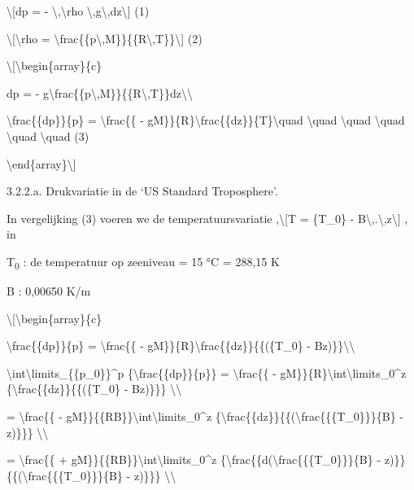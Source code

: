 \documentclass[]{article}
\begin{document}
\textbackslash{}{[}dp = - \textbackslash{},\textbackslash{}rho
\textbackslash{},g\textbackslash{},dz\textbackslash{}{]} (1)

\textbackslash{}{[}\textbackslash{}rho =
\textbackslash{}frac\{\{p\textbackslash{},M\}\}\{\{R\textbackslash{},T\}\}\textbackslash{}{]}
(2)

\textbackslash{}{[}\textbackslash{}begin\{array\}\{c\}

dp = -
g\textbackslash{}frac\{\{p\textbackslash{},M\}\}\{\{R\textbackslash{},T\}\}dz\textbackslash{}\textbackslash{}

\textbackslash{}frac\{\{dp\}\}\{p\} = \textbackslash{}frac\{\{ -
gM\}\}\{R\}\textbackslash{}frac\{\{dz\}\}\{T\}\textbackslash{}quad
\textbackslash{}quad \textbackslash{}quad \textbackslash{}quad
\textbackslash{}quad \textbackslash{}quad (3)

\textbackslash{}end\{array\}\textbackslash{}{]}

3.2.2.a. Drukvariatie in de `US Standard Troposphere'.

In vergelijking (3) voeren we de temperatuursvariatie
,\textbackslash{}{[}T = \{T\_0\} -
B\textbackslash{},.\textbackslash{},z\textbackslash{}{]} , in

T\textsubscript{0} : de temperatuur op zeeniveau = 15 °C = 288,15 K

B : 0,00650 K/m

\textbackslash{}{[}\textbackslash{}begin\{array\}\{c\}

\textbackslash{}frac\{\{dp\}\}\{p\} = \textbackslash{}frac\{\{ -
gM\}\}\{R\}\textbackslash{}frac\{\{dz\}\}\{\{(\{T\_0\} -
Bz)\}\}\textbackslash{}\textbackslash{}

\textbackslash{}int\textbackslash{}limits\_\{\{p\_0\}\}\^{}p
\{\textbackslash{}frac\{\{dp\}\}\{p\}\} = \textbackslash{}frac\{\{ -
gM\}\}\{R\}\textbackslash{}int\textbackslash{}limits\_0\^{}z
\{\textbackslash{}frac\{\{dz\}\}\{\{(\{T\_0\} - Bz)\}\}\}
\textbackslash{}\textbackslash{}

= \textbackslash{}frac\{\{ -
gM\}\}\{\{RB\}\}\textbackslash{}int\textbackslash{}limits\_0\^{}z
\{\textbackslash{}frac\{\{dz\}\}\{\{(\textbackslash{}frac\{\{\{T\_0\}\}\}\{B\}
- z)\}\}\} \textbackslash{}\textbackslash{}

= \textbackslash{}frac\{\{ +
gM\}\}\{\{RB\}\}\textbackslash{}int\textbackslash{}limits\_0\^{}z
\{\textbackslash{}frac\{\{d(\textbackslash{}frac\{\{\{T\_0\}\}\}\{B\} -
z)\}\}\{\{(\textbackslash{}frac\{\{\{T\_0\}\}\}\{B\} - z)\}\}\}
\textbackslash{}\textbackslash{}
\end{document}
